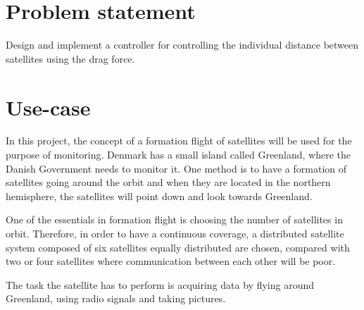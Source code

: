 \section{Problem statement}
Design and implement a controller for controlling the individual distance between satellites using the drag force.
\section{Use-case}\label{sec:useCase}
In this project, the concept of a formation flight of satellites will be used for the purpose of monitoring. Denmark has a small island called Greenland, where the Danish Government needs to monitor it. One method is to have a formation of satellites going around the orbit and when they are located in the northern hemisphere, the satellites will point down and look towards Greenland. 

One of the essentials in formation flight is choosing the number of satellites in orbit. Therefore, in order to have a continuous coverage, a distributed satellite system composed of six satellites equally distributed are chosen, compared with two or four satellites where communication between each other will be poor.

The task the satellite has to perform is acquiring data by flying around Greenland, using radio signals and taking pictures.

